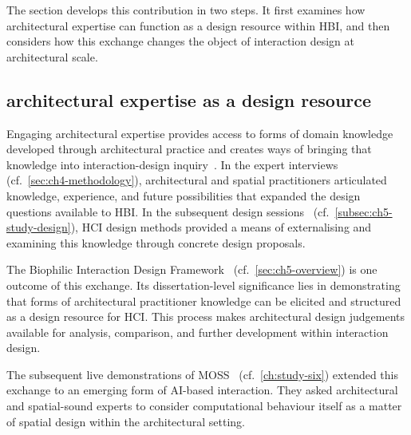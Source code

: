 The section develops this contribution in two steps. It first examines how architectural expertise can function as a design resource within HBI, and then considers how this exchange changes the object of interaction design at architectural scale.


\subsection{architectural expertise as a design resource}
\label{subsec:architectural-expertise}

Engaging architectural expertise provides access to forms of domain knowledge developed through architectural practice and creates ways of bringing that knowledge into interaction-design inquiry~\cite{kirsh2019architects}. In the expert interviews~\cite{rao2025designing} (cf.~\autoref{sec:ch4-methodology}), architectural and spatial practitioners articulated knowledge, experience, and future possibilities that expanded the design questions available to HBI. In the subsequent design sessions~\cite{rao2026biophilic} (cf.~\autoref{subsec:ch5-study-design}), HCI design methods provided a means of externalising and examining this knowledge through concrete design proposals.

The Biophilic Interaction Design Framework~\cite{rao2026biophilic} (cf.~\autoref{sec:ch5-overview}) is one outcome of this exchange. Its dissertation-level significance lies in demonstrating that forms of architectural practitioner knowledge can be elicited and structured as a design resource for HCI. This process makes architectural design judgements available for analysis, comparison, and further development within interaction design.

The subsequent live demonstrations of MOSS~\cite{rao2027biophilic} (cf.~\autoref{ch:study-six}) extended this exchange to an emerging form of AI-based interaction. They asked architectural and spatial-sound experts to consider
computational behaviour itself as a matter of spatial design within
the architectural setting. 


